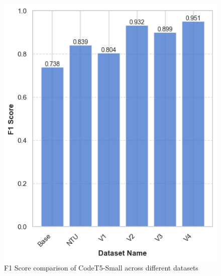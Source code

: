 \documentclass[conference]{IEEEtran}
\begin{document}
\begin{figure}[htbp]
\centerline{\includegraphics[width=\columnwidth]{images/t5_small.png}}
\caption{F1 Score comparison of CodeT5-Small across different datasets}
\label{small}
\end{figure}
\end{document}
